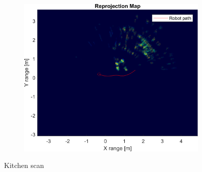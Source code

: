 \begin{figure}[htbp]
\begin{subfigure}[t]{0.5\linewidth}
        \includegraphics[width=\linewidth,max height=.475\textheight]{gfx/results/kitchen_reprojection.png}
    \end{subfigure}%
    \caption{Kitchen scan}
\end{figure}

